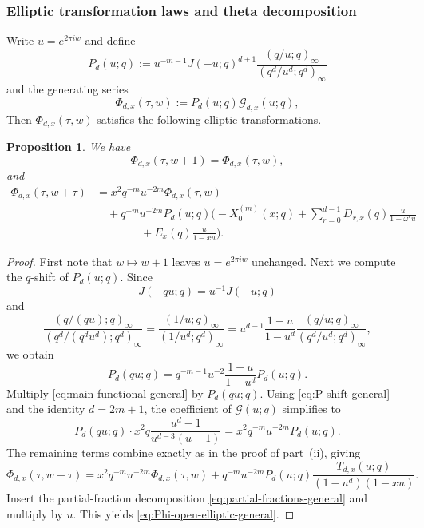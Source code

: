 \documentclass[12pt]{amsart}
\numberwithin{equation}{section}
\newtheorem{proposition}[theorem]{Proposition}
\begin{document}
\subsubsection{Elliptic transformation laws and theta decomposition}
Write $u=e^{2\pi i w}$ and define
\[
P_d(u;q):=u^{-m-1}J(-u;q)^{d+1}\frac{(q/u;q)_\infty}{(q^d/u^d;q^d)_\infty}
\]
and the generating series
\[
\Phi_{d,x}(\tau,w):=P_d(u;q)\mathcal G_{d,x}(u;q),
\]
Then $\Phi_{d,x}(\tau,w)$ satisfies the following elliptic transformations.
\begin{proposition}\label{prop:ellipticPhi}
We have
\[
\Phi_{d,x}(\tau,w+1)=\Phi_{d,x}(\tau,w),
\]
and
    \begin{equation}\label{eq:Phi-open-elliptic-general}
\begin{aligned}
\Phi_{d,x}(\tau,w+\tau)
&=
x^2q^{-m}u^{-2m}\Phi_{d,x}(\tau,w)\\
&\quad+
q^{-m}u^{-2m}P_d(u;q)
\Biggl(
- X_0^{(m)}(x;q)
+
\sum_{r=0}^{d-1}D_{r,x}(q)\frac{u}{1-\omega^ru}\\
&\qquad\qquad+
E_x(q)\frac{u}{1-xu}
\Biggr).
\end{aligned}
\end{equation}
\end{proposition}
    
\begin{proof}
      First note that $w\mapsto w+1$ leaves $u=e^{2\pi i w}$ unchanged.
      Next we compute the $q$-shift of $P_d(u;q)$.  Since
\[
J(-qu;q)=u^{-1}J(-u;q)
\]
and
\[
\frac{(q/(qu);q)_\infty}{(q^d/(q^d u^d);q^d)_\infty}
=
\frac{(1/u;q)_\infty}{(1/u^d;q^d)_\infty}
=u^{d-1}\frac{1-u}{1-u^d}\frac{(q/u;q)_\infty}{(q^d/u^d;q^d)_\infty},
\]
we obtain
\begin{equation}\label{eq:P-shift-general}
P_d(qu;q)=q^{-m-1}u^{-2}\frac{1-u}{1-u^d}P_d(u;q).
\end{equation}
Multiply \eqref{eq:main-functional-general} by $P_d(qu;q)$.  Using \eqref{eq:P-shift-general} and the identity $d=2m+1$, the coefficient of $\mathcal G(u;q)$ simplifies to
\[
P_d(qu;q)\cdot x^2 q\frac{u^d-1}{u^{d-3}(u-1)}
=
x^2q^{-m}u^{-2m}P_d(u;q).
\]
The remaining terms combine exactly as in the proof of part~(ii), giving
\[
\Phi_{d,x}(\tau,w+\tau)
=
x^2q^{-m}u^{-2m}\Phi_{d,x}(\tau,w)
+
q^{-m}u^{-2m}P_d(u;q)\frac{T_{d,x}(u;q)}{(1-u^d)(1-xu)}.
\]
Insert the partial-fraction decomposition \eqref{eq:partial-fractions-general} and multiply by $u$. This yields \eqref{eq:Phi-open-elliptic-general}. 
\end{proof}
\end{document}
